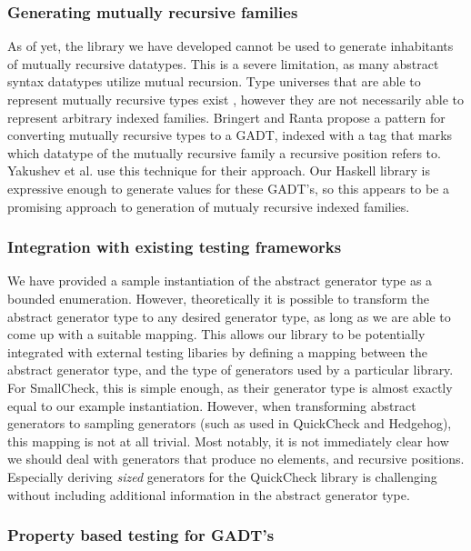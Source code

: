 \documentclass[a4paper,msc,twosized=semi]{uustthesis}
\let\oldemph\emph
\renewcommand\emph[1]{{\large\oldemph{#1}}}
\begin{document}
\subsubsection{Generating mutually recursive families}

  As of yet, the library we have developed cannot be used to generate inhabitants of 
  mutually recursive datatypes. This is a severe limitation, as many abstract syntax 
  datatypes utilize mutual recursion. Type universes that are able to represent 
  mutually recursive types exist \cite{miraldo2018sums , yakushev2009generic}, however 
  they are not necessarily able to represent arbitrary indexed families. Bringert and 
  Ranta \cite{bringert2006pattern} propose a pattern for converting mutually recursive 
  types to a GADT, indexed with a tag that marks which datatype of the mutually 
  recursive family a recursive position refers to. Yakushev et al. \cite
  {yakushev2009generic} use this technique for their approach. Our Haskell library is 
  expressive enough to generate values for these GADT's, so this appears to be a 
  promising approach to generation of mutualy recursive indexed families. 

\subsubsection{Integration with existing testing frameworks}

  We have provided a sample instantiation of the abstract generator type as a bounded 
  enumeration. However, theoretically it is possible to transform the abstract 
  generator type to any desired generator type, as long as we are able to come up with 
  a suitable mapping. This allows our library to be potentially integrated with 
  external testing libaries by defining a mapping between the abstract generator type, 
  and the type of generators used by a particular library. For SmallCheck, this is 
  simple enough, as their generator type is almost exactly equal to our example 
  instantiation. However, when transforming abstract generators to sampling generators 
  (such as used in QuickCheck and Hedgehog), this mapping is not at all trivial. Most 
  notably, it is not immediately clear how we should deal with generators that produce 
  no elements, and recursive positions. Especially deriving \emph{sized} generators 
  for the QuickCheck library is challenging without including additional information 
  in the abstract generator type. 

\subsubsection{Property based testing for GADT's}
\end{document}
